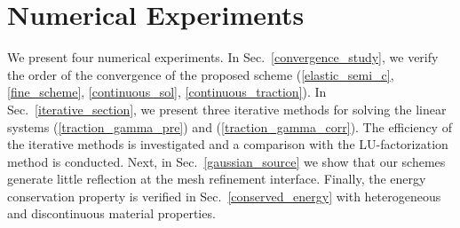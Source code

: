 \section{Numerical Experiments}
We present four numerical experiments. 
 In Sec.~\ref{convergence_study}, we verify the order of the convergence of the proposed scheme (\ref{elastic_semi_c}, \ref{fine_scheme}, \ref{continuous_sol}, \ref{continuous_traction}).  In  Sec.~\ref{iterative_section}, we present three iterative methods for solving the linear systems (\ref{traction_gamma_pre}) and (\ref{traction_gamma_corr}). The efficiency of the iterative methods is investigated and a comparison with the LU-factorization method is conducted. Next, in Sec.~\ref{gaussian_source} we show that our schemes generate little reflection at the mesh refinement interface. Finally, the energy conservation property is verified in Sec.~\ref{conserved_energy} with heterogeneous and discontinuous material properties.